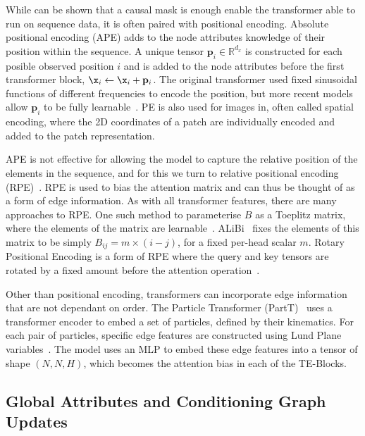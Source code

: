 While can be shown that a causal mask is enough enable the transformer able to run on sequence data, it is often paired with positional encoding.
Absolute positional encoding (APE) adds to the node attributes knowledge of their position within the sequence.
A unique tensor $\mathbf{p}_i \in \mathbb{R}^{d_x}$ is constructed for each posible observed position $i$ and is added to the node attributes before the first transformer block, $\x_i \leftarrow \x_i + \mathbf{p}_i$.
The original transformer used fixed sinusoidal functions of different frequencies to encode the position, but more recent models allow $\mathbf{p}_i$ to be fully learnable~.
PE is also used for images in, often called spatial encoding, where the 2D coordinates of a patch are individually encoded and added to the patch representation.

APE is not effective for allowing the model to capture the relative position of the elements in the sequence, and for this we turn to relative positional encoding (RPE)~.
RPE is used to bias the attention matrix and can thus be thought of as a form of edge information.
As with all transformer features, there are many approaches to RPE.
One such method to parameterise $B$ as a Toeplitz matrix, where the elements of the matrix are learnable~.
ALiBi~ fixes the elements of this matrix to be simply $B_{ij} = m\times(i - j)$, for a fixed per-head scalar $m$.
Rotary Positional Encoding is a form of RPE where the query and key tensors are rotated by a fixed amount before the attention operation~.

Other than positional encoding, transformers can incorporate edge information that are not dependant on order.
The Particle Transformer (PartT)~ uses a transformer encoder to embed a set of particles, defined by their kinematics.
For each pair of particles, specific edge features are constructed using Lund Plane variables~.
The model uses an MLP to embed these edge features into a tensor of shape $(N, N, H)$, which becomes the attention bias in each of the TE-Blocks.

\subsection{Global Attributes and Conditioning Graph Updates}

